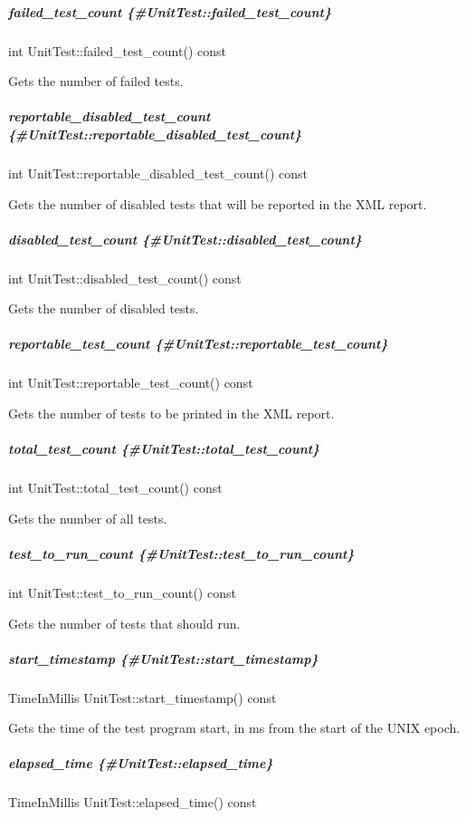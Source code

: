\subparagraph*{failed\+\_\+test\+\_\+count \{\#\+Unit\+Test\+::failed\+\_\+test\+\_\+count\}}

{\ttfamily int Unit\+Test\+::failed\+\_\+test\+\_\+count() const}

Gets the number of failed tests.

\subparagraph*{reportable\+\_\+disabled\+\_\+test\+\_\+count \{\#\+Unit\+Test\+::reportable\+\_\+disabled\+\_\+test\+\_\+count\}}

{\ttfamily int Unit\+Test\+::reportable\+\_\+disabled\+\_\+test\+\_\+count() const}

Gets the number of disabled tests that will be reported in the X\+ML report.

\subparagraph*{disabled\+\_\+test\+\_\+count \{\#\+Unit\+Test\+::disabled\+\_\+test\+\_\+count\}}

{\ttfamily int Unit\+Test\+::disabled\+\_\+test\+\_\+count() const}

Gets the number of disabled tests.

\subparagraph*{reportable\+\_\+test\+\_\+count \{\#\+Unit\+Test\+::reportable\+\_\+test\+\_\+count\}}

{\ttfamily int Unit\+Test\+::reportable\+\_\+test\+\_\+count() const}

Gets the number of tests to be printed in the X\+ML report.

\subparagraph*{total\+\_\+test\+\_\+count \{\#\+Unit\+Test\+::total\+\_\+test\+\_\+count\}}

{\ttfamily int Unit\+Test\+::total\+\_\+test\+\_\+count() const}

Gets the number of all tests.

\subparagraph*{test\+\_\+to\+\_\+run\+\_\+count \{\#\+Unit\+Test\+::test\+\_\+to\+\_\+run\+\_\+count\}}

{\ttfamily int Unit\+Test\+::test\+\_\+to\+\_\+run\+\_\+count() const}

Gets the number of tests that should run.

\subparagraph*{start\+\_\+timestamp \{\#\+Unit\+Test\+::start\+\_\+timestamp\}}

{\ttfamily Time\+In\+Millis Unit\+Test\+::start\+\_\+timestamp() const}

Gets the time of the test program start, in ms from the start of the U\+N\+IX epoch.

\subparagraph*{elapsed\+\_\+time \{\#\+Unit\+Test\+::elapsed\+\_\+time\}}

{\ttfamily Time\+In\+Millis Unit\+Test\+::elapsed\+\_\+time() const}

